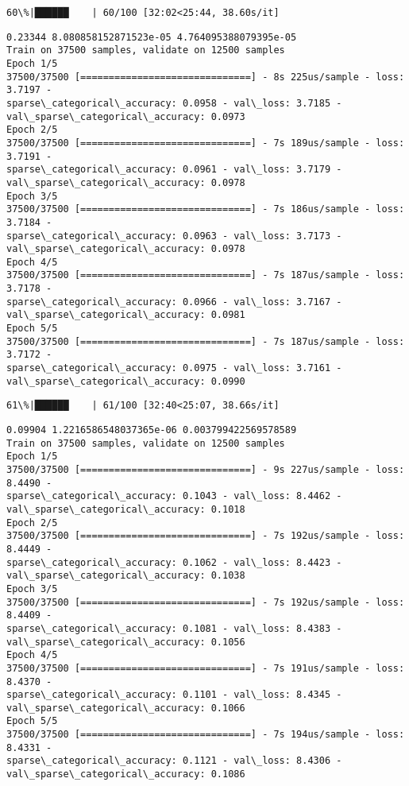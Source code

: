 \documentclass[11pt]{article}
\begin{document}
    \begin{Verbatim}[commandchars=\\\{\}]
 60\%|██████    | 60/100 [32:02<25:44, 38.60s/it]
    \end{Verbatim}

    \begin{Verbatim}[commandchars=\\\{\}]
0.23344 8.080858152871523e-05 4.764095388079395e-05
Train on 37500 samples, validate on 12500 samples
Epoch 1/5
37500/37500 [==============================] - 8s 225us/sample - loss: 3.7197 -
sparse\_categorical\_accuracy: 0.0958 - val\_loss: 3.7185 -
val\_sparse\_categorical\_accuracy: 0.0973
Epoch 2/5
37500/37500 [==============================] - 7s 189us/sample - loss: 3.7191 -
sparse\_categorical\_accuracy: 0.0961 - val\_loss: 3.7179 -
val\_sparse\_categorical\_accuracy: 0.0978
Epoch 3/5
37500/37500 [==============================] - 7s 186us/sample - loss: 3.7184 -
sparse\_categorical\_accuracy: 0.0963 - val\_loss: 3.7173 -
val\_sparse\_categorical\_accuracy: 0.0978
Epoch 4/5
37500/37500 [==============================] - 7s 187us/sample - loss: 3.7178 -
sparse\_categorical\_accuracy: 0.0966 - val\_loss: 3.7167 -
val\_sparse\_categorical\_accuracy: 0.0981
Epoch 5/5
37500/37500 [==============================] - 7s 187us/sample - loss: 3.7172 -
sparse\_categorical\_accuracy: 0.0975 - val\_loss: 3.7161 -
val\_sparse\_categorical\_accuracy: 0.0990
    \end{Verbatim}

    \begin{Verbatim}[commandchars=\\\{\}]
 61\%|██████    | 61/100 [32:40<25:07, 38.66s/it]
    \end{Verbatim}

    \begin{Verbatim}[commandchars=\\\{\}]
0.09904 1.2216586548037365e-06 0.003799422569578589
Train on 37500 samples, validate on 12500 samples
Epoch 1/5
37500/37500 [==============================] - 9s 227us/sample - loss: 8.4490 -
sparse\_categorical\_accuracy: 0.1043 - val\_loss: 8.4462 -
val\_sparse\_categorical\_accuracy: 0.1018
Epoch 2/5
37500/37500 [==============================] - 7s 192us/sample - loss: 8.4449 -
sparse\_categorical\_accuracy: 0.1062 - val\_loss: 8.4423 -
val\_sparse\_categorical\_accuracy: 0.1038
Epoch 3/5
37500/37500 [==============================] - 7s 192us/sample - loss: 8.4409 -
sparse\_categorical\_accuracy: 0.1081 - val\_loss: 8.4383 -
val\_sparse\_categorical\_accuracy: 0.1056
Epoch 4/5
37500/37500 [==============================] - 7s 191us/sample - loss: 8.4370 -
sparse\_categorical\_accuracy: 0.1101 - val\_loss: 8.4345 -
val\_sparse\_categorical\_accuracy: 0.1066
Epoch 5/5
37500/37500 [==============================] - 7s 194us/sample - loss: 8.4331 -
sparse\_categorical\_accuracy: 0.1121 - val\_loss: 8.4306 -
val\_sparse\_categorical\_accuracy: 0.1086
    \end{Verbatim}
\end{document}
